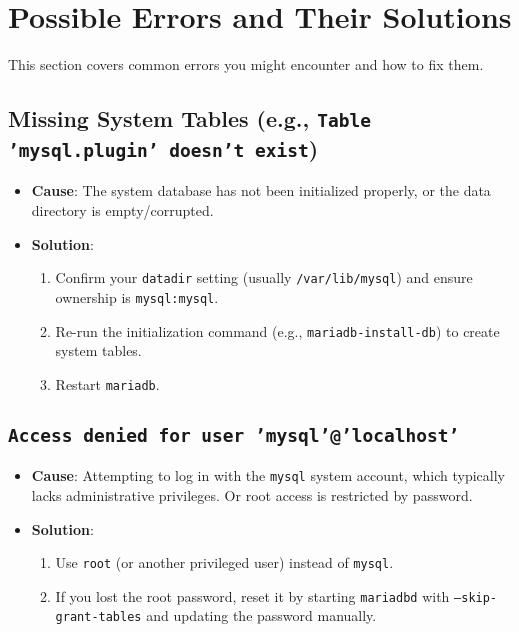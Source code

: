 \documentclass[10pt]{article}
\begin{document}
\section{Possible Errors and Their Solutions}
This section covers common errors you might encounter and how to fix them.

\subsection{Missing System Tables (e.g., \texttt{Table 'mysql.plugin' doesn't exist})}
\begin{itemize}
    \item \textbf{Cause}: The system database has not been initialized properly, or the data directory is empty/corrupted.
    \item \textbf{Solution}:
          \begin{enumerate}
              \item Confirm your \texttt{datadir} setting (usually \texttt{/var/lib/mysql}) and ensure ownership is \texttt{mysql:mysql}.
              \item Re-run the initialization command (e.g., \texttt{mariadb-install-db}) to create system tables.
              \item Restart \texttt{mariadb}.
          \end{enumerate}
\end{itemize}

\subsection{\texttt{Access denied for user 'mysql'@'localhost'}}
\begin{itemize}
    \item \textbf{Cause}: Attempting to log in with the \texttt{mysql} system account, which typically lacks administrative privileges. Or root access is restricted by password.
    \item \textbf{Solution}:
          \begin{enumerate}
              \item Use \texttt{root} (or another privileged user) instead of \texttt{mysql}.
              \item If you lost the root password, reset it by starting \texttt{mariadbd} with \texttt{--skip-grant-tables} and updating the password manually.
          \end{enumerate}
\end{itemize}
\end{document}
